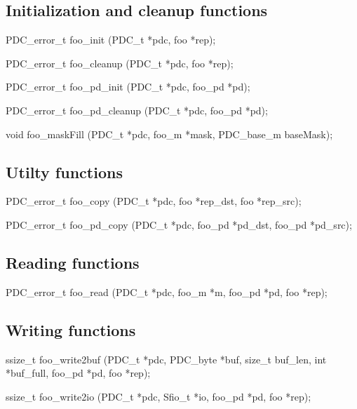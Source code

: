 \subsection{Initialization and cleanup functions}
\begin{code}
PDC_error_t foo_init (PDC_t *pdc, foo *rep);

PDC_error_t foo_cleanup (PDC_t *pdc, foo *rep);

PDC_error_t foo_pd_init (PDC_t *pdc, foo_pd *pd);

PDC_error_t foo_pd_cleanup (PDC_t *pdc, foo_pd *pd);

void foo_maskFill (PDC_t *pdc, foo_m *mask, PDC_base_m baseMask);

\end{code}

\subsection{Utilty functions}
\begin{code}
PDC_error_t foo_copy (PDC_t *pdc, foo *rep_dst, foo *rep_src);

PDC_error_t foo_pd_copy (PDC_t *pdc, foo_pd *pd_dst, foo_pd *pd_src);
\end{code}

\subsection{Reading functions}
\begin{code}
PDC_error_t foo_read (PDC_t *pdc, foo_m *m, foo_pd *pd, foo *rep);
\end{code}

\subsection{Writing functions}
\begin{code}
ssize_t foo_write2buf (PDC_t *pdc, PDC_byte *buf, size_t buf_len, 
                       int *buf_full, foo_pd *pd, foo *rep);

ssize_t foo_write2io (PDC_t *pdc, Sfio_t *io, foo_pd *pd, foo *rep);

\end{code}

